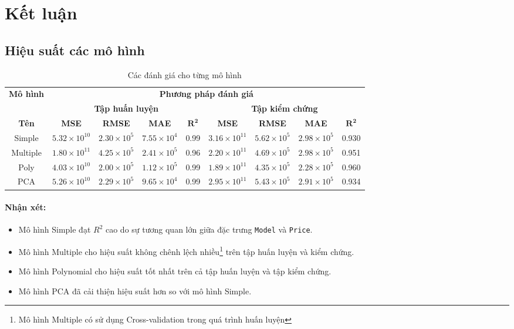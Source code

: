 \newpage
\section{Kết luận}
\subsection{Hiệu suất các mô hình}

\begin{table}[H]
\centering
\label{tab:metrics}
\begin{tabular}{@{}ccccccccc@{}}
\toprule
\multirow{2}{*}{\textbf{Mô hình}} &
  \multicolumn{8}{c}{\textbf{Phương pháp đánh giá}} \\ \cmidrule(l){2-9} 
 &
  \multicolumn{4}{c|}{\textbf{Tập huấn luyện}} &
  \multicolumn{4}{c}{\textbf{Tập kiểm chứng}} \\ \midrule
\textbf{Tên} &
  \textbf{MSE} &
  \textbf{RMSE} &
  \textbf{MAE} &
  \multicolumn{1}{c|}{$\bm{R^2}$} &
  \textbf{MSE} &
  \textbf{RMSE} &
  \textbf{MAE} &
  $\bm{R^2}$ \\ \midrule
Simple &
  $5.32 \times 10^{10}$ &
  $2.30 \times 10^{5}$ &
  $7.55 \times 10^{4}$ &
  \multicolumn{1}{c|}{0.99} &
  $3.16 \times 10^{11}$ &
  $5.62 \times 10^{5}$ &
  $2.98 \times 10^{5}$ &
  0.930 \\
Multiple &
  $1.80 \times 10^{11}$ &
  $4.25 \times 10^{5}$ &
  $2.41 \times 10^{5}$ &
  \multicolumn{1}{c|}{0.96} &
  $2.20 \times 10^{11}$ &
  $4.69 \times 10^{5}$ &
  $2.98 \times 10^{5}$ &
  0.951 \\
Poly &
  $4.03 \times 10^{10}$ &
  $2.00 \times 10^{5}$ &
  $1.12 \times 10^{5}$ &
  \multicolumn{1}{c|}{0.99} &
  $1.89 \times 10^{11}$ &
  $4.35 \times 10^{5}$ &
  $2.28 \times 10^{5}$ &
  0.960 \\
PCA &
  $5.26 \times 10^{10}$ &
  $2.29 \times 10^{5}$ &
  $9.65 \times 10^{4}$ &
  \multicolumn{1}{c|}{0.99} &
  $2.95 \times 10^{11}$ &
  $5.43 \times 10^{5}$ &
  $2.91 \times 10^{5}$ &
  0.934 \\ \bottomrule
\end{tabular}
\caption{Các đánh giá cho từng mô hình}
\end{table}

\paragraph{Nhận xét:}
\begin{itemize}
    \item Mô hình Simple đạt $R^2$ cao do sự tương quan lớn giữa đặc trưng \texttt{Model} và \texttt{Price}.
    \item Mô hình Multiple cho hiệu suất không chênh lệch nhiều\footnote{Mô hình Multiple có sử dụng Cross-validation trong quá trình huấn luyện} trên tập huấn luyện và kiểm chứng. 
    \item Mô hình Polynomial cho hiệu suất tốt nhất trên cả tập huấn luyện và tập kiểm chứng.
    \item Mô hình PCA đã cải thiện hiệu suất hơn so với mô hình Simple.
\end{itemize}

